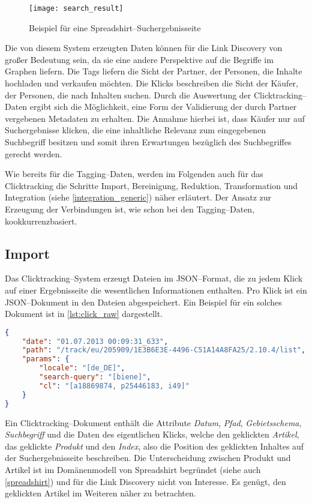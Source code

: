 \begin{figure}[t]
\centering
\texttt{[image: search\_result]}
\caption{Beispiel für eine Spreadshirt--Suchergebnisseite}
\label{fig:search_result}
\end{figure}

Die von diesem System erzeugten Daten können für die Link Discovery von großer Bedeutung sein, da sie eine andere Perspektive auf die Begriffe im Graphen liefern. Die Tags liefern die Sicht der Partner, der Personen, die Inhalte hochladen und verkaufen möchten. Die Klicks beschreiben die Sicht der Käufer, der Personen, die nach Inhalten suchen. Durch die Auswertung der Clicktracking--Daten ergibt sich die Möglichkeit, eine Form der Validierung der durch Partner vergebenen Metadaten zu erhalten. Die Annahme hierbei ist, dass Käufer nur auf Suchergebnisse klicken, die eine inhaltliche Relevanz zum eingegebenen Suchbegriff besitzen und somit ihren Erwartungen bezüglich des Suchbegriffes gerecht werden.

Wie bereits für die Tagging--Daten, werden im Folgenden auch für das Clicktracking die Schritte Import, Bereinigung, Reduktion, Transformation und Integration (siehe \cref{integration_generic}) näher erläutert. Der Ansatz zur Erzeugung der Verbindungen ist, wie schon bei den Tagging--Daten, kookkurrenzbasiert.

\subsection{Import}
\label{click_import}

Das Clicktracking--System erzeugt Dateien im JSON--Format, die zu jedem Klick auf einer Ergebnisseite die wesentlichen Informationen enthalten. Pro Klick ist ein JSON--Dokument in den Dateien abgespeichert. Ein Beispiel für ein solches Dokument ist in \cref{lst:click_raw} dargestellt.

\begin{lstlisting}[language=json, label={lst:click_raw}, caption={JSON--Beispiel für ein Clicktracking--Rohdokument}, float]
{
    "date": "01.07.2013 00:09:31_633",
    "path": "/track/eu/205909/1E3B6E3E-4496-C51A14A8FA25/2.10.4/list",
    "params": {
        "locale": "[de_DE]",
        "search-query": "[biene]",
        "cl": "[a18869874, p25446183, i49]"
    }
}
\end{lstlisting}

Ein Clicktracking--Dokument enthält die Attribute \emph{Datum}, \emph{Pfad}, \emph{Gebietsschema}, \emph{Suchbegriff} und die Daten des eigentlichen Klicks, welche den geklickten \emph{Artikel}, das geklickte \emph{Produkt} und den \emph{Index}, also die Position des geklickten Inhaltes auf der Suchergebnisseite beschreiben. Die Unterscheidung zwischen Produkt und Artikel ist im Domänenmodell von Spreadshirt begründet (siehe auch \cref{spreadshirt}) und für die Link Discovery nicht von Interesse. Es genügt, den geklickten Artikel im Weiteren näher zu betrachten.

